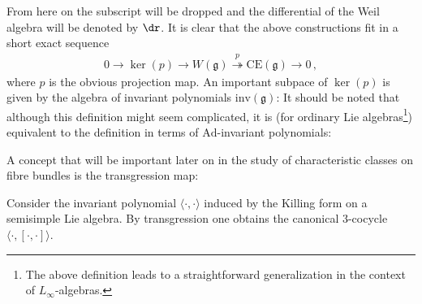     From here on the subscript will be dropped and the differential of the Weil algebra will be denoted by $\dr$. It is clear that the above constructions fit in a short exact sequence
    \begin{gather}
        \label{lie:weil_algebra_sequence}
        0\rightarrow\ker(p)\rightarrow W(\mathfrak{g})\overset{p}{\twoheadrightarrow}\mathrm{CE}(\mathfrak{g})\rightarrow0\,,
    \end{gather}
    where $p$ is the obvious projection map. An important subpace of $\ker(p)$ is given by the algebra of invariant polynomials $\mathrm{inv}(\mathfrak{g})$:
    It should be noted that although this definition might seem complicated, it is (for ordinary Lie algebras\footnote{The above definition leads to a straightforward generalization in the context of $L_\infty$-algebras.}) equivalent to the definition in terms of $\mathrm{Ad}$-invariant polynomials:

    A concept that will be important later on in the study of characteristic classes on fibre bundles is the transgression map:
    \begin{example}\label{lie:killing_transgression}
        Consider the invariant polynomial $\langle\cdot,\cdot\rangle$ induced by the Killing form on a semisimple Lie algebra. By transgression one obtains the canonical 3-cocycle $\langle\cdot,[\cdot,\cdot]\rangle$.
    \end{example}